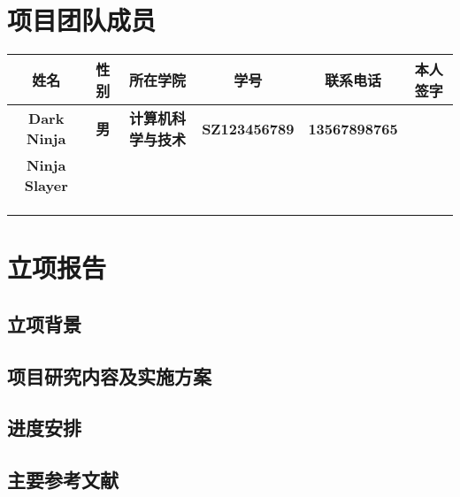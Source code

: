 \documentclass[12pt]{article}
\begin{document}
\section{ 项目团队成员 }
\begin{table}[h]
	\centering
	\begin{adjustbox}{width=1\textwidth}
		\begin{tabular}{|c|c|c|c|c|c|}
			\hline
			\textbf{姓名}         & \textbf{性别} & \textbf{所在学院}         & \textbf{学号}        & \textbf{联系电话}    & \textbf{本人签字} \\ \hline
			\textbf{Dark Ninja}   & \textbf{男}   & \textbf{计算机科学与技术} & \textbf{SZ123456789} & \textbf{13567898765} & \textbf{}         \\ \hline
			\textbf{Ninja Slayer} & \textbf{}     & \textbf{}                 & \textbf{}            & \textbf{}            & \textbf{}         \\ \hline
			\textbf{}             & \textbf{}     & \textbf{}                 & \textbf{}            & \textbf{}            & \textbf{}         \\ \hline
			\textbf{}             & \textbf{}     & \textbf{}                 & \textbf{}            & \textbf{}            & \textbf{}         \\ \hline
			\textbf{}             & \textbf{}     & \textbf{}                 & \textbf{}            & \textbf{}            & \textbf{}         \\ \hline
		\end{tabular}
	\end{adjustbox}
\end{table}

\section{ 立项报告 }
\begin{mdframed}{%
		\subsection{ 立项背景 } %
		\subsection{ 项目研究内容及实施方案 }
		\subsection{ 进度安排 }
		\subsection{ 主要参考文献 } %
		\vfil
	}
\end{mdframed}
\end{document}

